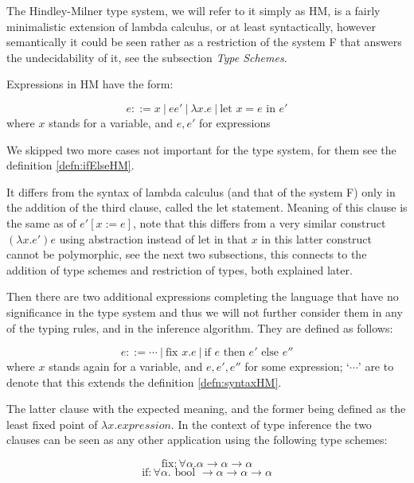 The Hindley-Milner type system, we will refer to it simply as HM, is a fairly minimalistic extension of lambda calculus, or at least syntactically, however semantically it could be seen rather as a restriction of the system F that answers the undecidability of it, see the subsection \emph{Type Schemes}.

Expressions in HM have the form:

\begin{defn}[HM expressions]
    \label{defn:syntaxHM}
    $$e ::= x\ |\ e e'\ |\ \lambda x . e\ |\ \text{let } x = e \text{ in } e'$$
    where $x$ stands for a variable, and $e, e'$ for expressions
\end{defn}

We skipped two more cases not important for the type system, for them see the definition \ref{defn:ifElseHM}.

It differs from the syntax of lambda calculus (and that of the system F) only in the addition of the third clause, called the let statement. Meaning of this clause is the same as of $e' [x := e]$, note that this differs from a very similar construct $(\lambda x . e') e$ using abstraction instead of let in that $x$ in this latter construct cannot be polymorphic, see the next two subsections, this connects to the addition of type schemes and restriction of types, both explained later. %

Then there are two additional expressions completing the language that have no significance in the type system and thus we will not further consider them in any of the typing rules, and in the inference algorithm. They are defined as follows:

\begin{defn}
    \label{defn:ifElseHM}
    $$e ::= \cdots\ |\ \text{fix } x . e\ |\ \text{if } e \text{ then } e' \text{ else } e''$$
    where $x$ stands again for a variable, and $e, e', e''$ for some expression; `$\cdots$' are to denote that this extends the definition \ref{defn:syntaxHM}.
\end{defn}

The latter clause with the expected meaning, and the former being defined as the least fixed point of $\lambda x . expression$. In the context of type inference the two clauses can be seen as any other application using the following type schemes:

$$\text{fix}: \forall \alpha . \alpha \rightarrow \alpha \rightarrow \alpha$$
$$\text{if}: \forall \alpha . \text{ bool } \rightarrow \alpha \rightarrow \alpha \rightarrow \alpha$$

